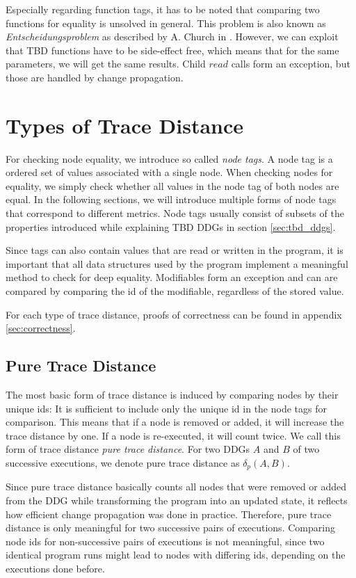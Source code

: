 Especially regarding function tags, it has to be noted that comparing two functions for equality is unsolved in general. This problem is also known as \textit{Entscheidungsproblem} as described by A. Church in \cite{church1936note}. However, we can exploit that TBD functions have to be side-effect free, which means that for the same parameters, we will get the same results. Child $read$ calls form an exception, but those are handled by change propagation. 
  
\section{Types of Trace Distance}
For checking node equality, we introduce so called \textit{node tags}. A node tag is a ordered set of values associated with a single node. When checking nodes for equality, we simply check whether all values in the node tag of both nodes are equal. In the following sections, we will introduce multiple forms of node tags that correspond to different metrics. Node tags usually consist of subsets of the properties introduced while explaining TBD DDGs in section \ref{sec:tbd_ddgs}.

Since tags can also contain values that are read or written in the program, it is important that all data structures used by the program implement a meaningful method to check for deep equality. Modifiables form an exception and can are compared by comparing the id of the modifiable, regardless of the stored value. 

For each type of trace distance, proofs of correctness can be found in appendix \ref{sec:correctness}.

\subsection{Pure Trace Distance}

The most basic form of trace distance is induced by comparing nodes by their unique ids: It is sufficient to include only the unique id in the node tags for comparison. This means that if a node is removed or added, it will increase the trace distance by one. If a node is re-executed, it will count twice. We call this form of trace distance \textit{pure trace distance}. For two DDGs $A$ and $B$ of two successive executions, we denote pure trace distance as $\delta_p(A, B)$.

Since pure trace distance basically counts all nodes that were removed or added from the DDG while transforming the program into an updated state, it reflects how efficient change propagation was done in practice. Therefore, pure trace distance is only meaningful for two successive pairs of executions. Comparing node ids for non-successive pairs of executions is not meaningful, since two identical program runs might lead to nodes with differing ids, depending on the executions done before. 

